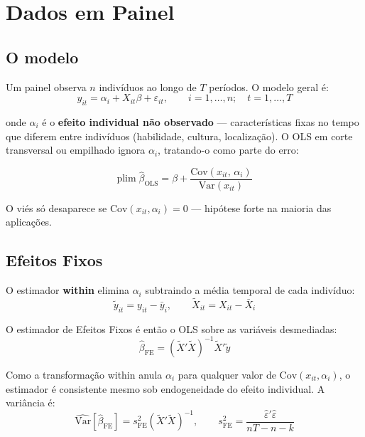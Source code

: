 \chapter{Dados em Painel}
\label{cap:painel}

\section{O modelo}

Um painel observa $n$ indivíduos ao longo de $T$ períodos. O modelo geral é:
\[
  y_{it} = \alpha_i + X_{it}\beta + \varepsilon_{it},
  \qquad i = 1,\ldots,n;\quad t = 1,\ldots,T
\]

onde $\alpha_i$ é o \textbf{efeito individual não observado} — características
fixas no tempo que diferem entre indivíduos (habilidade, cultura, localização).
O OLS em corte transversal ou empilhado ignora $\alpha_i$, tratando-o como parte
do erro:

\[
  \mathrm{plim}\;\hat\beta_{\mathrm{OLS}}
  = \beta + \frac{\mathrm{Cov}(x_{it},\,\alpha_i)}{\mathrm{Var}(x_{it})}
\]

O viés só desaparece se $\mathrm{Cov}(x_{it}, \alpha_i) = 0$ — hipótese forte
na maioria das aplicações.

\section{Efeitos Fixos}

O estimador \textbf{within} elimina $\alpha_i$ subtraindo a média temporal
de cada indivíduo:
\[
  \tilde{y}_{it} = y_{it} - \bar{y}_i, \qquad
  \tilde{X}_{it} = X_{it} - \bar{X}_i
\]

O estimador de Efeitos Fixos é então o OLS sobre as variáveis desmediadas:
\[
  \boxed{\hat\beta_{\mathrm{FE}} = (\tilde{X}'\tilde{X})^{-1}\tilde{X}'\tilde{y}}
\]

Como a transformação within anula $\alpha_i$ para qualquer valor de
$\mathrm{Cov}(x_{it}, \alpha_i)$, o estimador é consistente mesmo sob
endogeneidade do efeito individual. A variância é:
\[
  \widehat{\mathrm{Var}}[\hat\beta_{\mathrm{FE}}] = s^2_{\mathrm{FE}}(\tilde{X}'\tilde{X})^{-1},
  \qquad
  s^2_{\mathrm{FE}} = \frac{\hat\varepsilon'\hat\varepsilon}{nT - n - k}
\]

